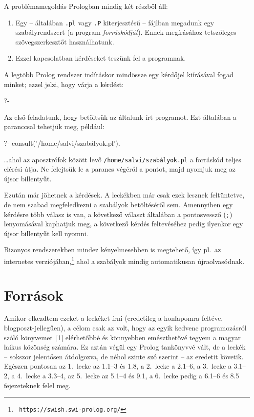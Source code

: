A problémamegoldás Prologban mindig két részből áll:
\begin{enumerate}
\item Egy -- általában {\tt .pl} vagy {\tt .P} kiterjesztésű --
  fájlban megadunk egy szabályrendszert (a program
  \emph{forráskódját}). Ennek megírásához tetszőleges
  szövegszerkesztőt használhatunk.
\item Ezzel kapcsolatban kérdéseket teszünk fel a programnak.
\end{enumerate}
A legtöbb Prolog rendszer indításkor mindössze egy kérdőjel kiírásával
fogad minket; ezzel jelzi, hogy várja a kérdést:
\begin{query}
?-
\end{query}  
Az első feladatunk, hogy betöltsük az általunk írt programot. Ezt
általában a  paranccsal tehetjük meg, például:
\begin{query}
?- consult('/home/salvi/szabályok.pl').
\end{query}
\dots ahol az aposztrófok között levő {\tt /home/salvi/szabályok.pl} a
forráskód teljes elérési útja. Ne felejtsük le a parancs végéről a
pontot, majd nyomjuk meg az újsor billentyűt.

Ezután már jöhetnek a kérdések. A leckékben már csak ezek lesznek
feltüntetve, de nem szabad megfeledkezni a szabályok betöltéséről sem.
Amennyiben egy kérdésre több válasz is van, a következő választ
általában a pontosvessző ({\tt ;}) lenyomásával kaphatjuk meg, a
következő kérdés feltevéséhez pedig ilyenkor egy újsor billentyűt kell
nyomni.

Bizonyos rendszerekben mindez kényelmesebben is megtehető, így pl.~az
 internetes  verziójában,\footnote[2]{\tt
https://swish.swi-prolog.org/} ahol a szabályok mindig automatikusan
újraolvasódnak.

\section*{Források}
Amikor elkezdtem ezeket a leckéket írni (eredetileg a honlapomra
feltéve, blogposzt-jellegűen), a célom csak az volt, hogy az egyik
kedvenc programozásról szóló könyvemet~[1] elérhetőbbé és könnyebben
emészthetővé tegyem a magyar laikus közönség számára. Ez aztán végül
egy Prolog tankönyvvé vált, de a leckék -- sokszor jelentősen
átdolgozva, de néhol szinte szó szerint -- az eredetit
követik. Egészen pontosan az 1.~lecke az 1.1--3 és 1.8, a 2.~lecke a
2.1--6, a 3.~lecke a 3.1--2, a 4.~lecke a 3.3--4, az 5.~lecke az
5.1--4 és 9.1, a 6.~lecke pedig a 6.1--6 és 8.5 fejezeteknek felel
meg.

